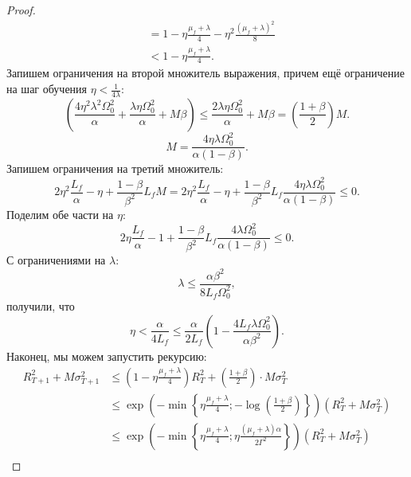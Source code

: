 \begin{proof}
\begin{equation*}
\begin{split}
     & = 1 - \eta \frac{\mu_f + \lambda}{4} - \eta^2 \frac{(\mu_f + \lambda)^2}{8} \\
     & < 1 - \eta \frac{\mu_f + \lambda}{4}.
    \end{split}
\end{equation*}
Запишем ограничения на второй множитель выражения, причем ещё ограничение на шаг обучения  $\eta < \frac{1}{4\lambda}$:
\begin{equation*}
    \left( \frac{4\eta^2\lambda^2\Omega_0^2}{\alpha} + \frac{\lambda\eta\Omega_0^2}{\alpha} + M\beta\right) \leq \frac{2\lambda\eta\Omega_0^2}{\alpha} + M\beta = \left(\frac{1+\beta}{2} \right)M.
\end{equation*}
\begin{equation*}
    M = \frac{4\eta \lambda \Omega_0^2}{\alpha(1-\beta)}.
\end{equation*}
Запишем ограничения на третий множитель:
\begin{equation*}
    2\eta^2 \frac{L_f}{\alpha} - \eta + \frac{1-\beta}{\beta^2}L_fM = 2\eta^2 \frac{L_f}{\alpha} - \eta + \frac{1-\beta}{\beta^2}L_f \frac{4\eta \lambda \Omega_0^2}{\alpha(1-\beta)} \leq 0.
\end{equation*}
Поделим обе части на $\eta$:
\begin{equation*}
    2\eta \frac{L_f}{\alpha} - 1 + \frac{1-\beta}{\beta^2}L_f \frac{4 \lambda \Omega_0^2}{\alpha(1-\beta)} \leq 0.
\end{equation*}
С ограничениями на $\lambda:$ 
\begin{equation*}
\lambda \leq \frac{\alpha \beta^2}{8L_f\Omega_0^2},
\end{equation*}
получили, что
\begin{equation*}
    \eta < \frac{\alpha}{4 L_f} \leq \frac{\alpha}{2L_f} \left(1 - \frac{4L_f\lambda\Omega_0^2}{\alpha\beta^2} \right).
\end{equation*}
Наконец, мы можем запустить рекурсию:
\begin{equation*}
\begin{split}
    R_{T+1}^2 + M \sigma_{T+1}^2 & \leq \left(1-\eta\frac{\mu_f+\lambda}{4} \right) R_T^2 + \left(\frac{1+\beta}{2}\right) \cdot M \sigma_T^2 \\
    & \leq \exp{\left(- \min \left\{\eta\frac{\mu_f + \lambda}{4}; -\log\left(\frac{1+\beta}{2} \right) \right\} \right)} \left( R_T^2 + M \sigma_T^2 \right) \\
    & \leq \exp{\left(- \min \left\{\eta\frac{\mu_f + \lambda}{4};\eta\frac{(\mu_f + \lambda)\alpha}{2\Gamma^2}  \right\} \right)} \left( R_T^2 + M \sigma_T^2 \right) \\

\end{split}
\end{equation*}
\end{proof}
